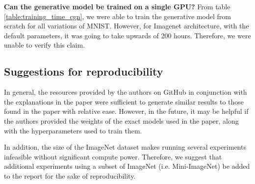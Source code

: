 \textbf{Can the generative model be trained on a single GPU?} From table \ref{table:training_time_cgn}, we were able to train the generative model from scratch for all variations of MNIST. However, for Imagenet architecture, with the default parameters, it was going to take upwards of 200 hours. Therefore, we were unable to verify this claim.


\subsection{Suggestions for reproducibility}
In general, the resources provided by the authors on GitHub in conjunction with the explanations in the paper were sufficient to generate similar results to those found in the paper with relative ease. However, in the future, it may be helpful if the authors provided the weights of the exact models used in the paper, along with the hyperparameters used to train them.

In addition, the size of the ImageNet dataset makes running several experiments infeasible without significant compute power. Therefore, we suggest that additional experiments using a subset of ImageNet (i.e. Mini-ImageNet) be added to the report for the sake of reproducibility.



